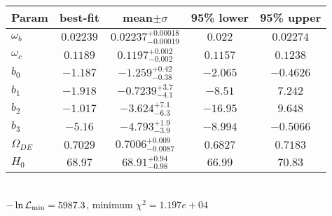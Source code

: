 \begin{tabular}{|l|c|c|c|c|} 
 \hline 
Param & best-fit & mean$\pm\sigma$ & 95\% lower & 95\% upper \\ \hline 
$\omega_b$ &$0.02239$ & $0.02237_{-0.00019}^{+0.00018}$ & $0.022$ & $0.02274$ \\ 
$\omega_c$ &$0.1189$ & $0.1197_{-0.002}^{+0.002}$ & $0.1157$ & $0.1238$ \\ 
$b_{0 }$ &$-1.187$ & $-1.259_{-0.38}^{+0.42}$ & $-2.065$ & $-0.4626$ \\ 
$b_{1 }$ &$-1.918$ & $-0.7239_{-4.1}^{+3.7}$ & $-8.51$ & $7.242$ \\ 
$b_{2 }$ &$-1.017$ & $-3.624_{-6.3}^{+7.1}$ & $-16.95$ & $9.648$ \\ 
$b_{3 }$ &$-5.16$ & $-4.793_{-3.9}^{+1.9}$ & $-8.994$ & $-0.5066$ \\ 
$\Omega_{DE}$ &$0.7029$ & $0.7006_{-0.0087}^{+0.009}$ & $0.6827$ & $0.7183$ \\ 
$H_{0 }$ &$68.97$ & $68.91_{-0.98}^{+0.94}$ & $66.99$ & $70.83$ \\ 
\hline 
 \end{tabular} \\ 
$-\ln{\cal L}_\mathrm{min} =5987.3$, minimum $\chi^2=1.197e+04$ \\ 
